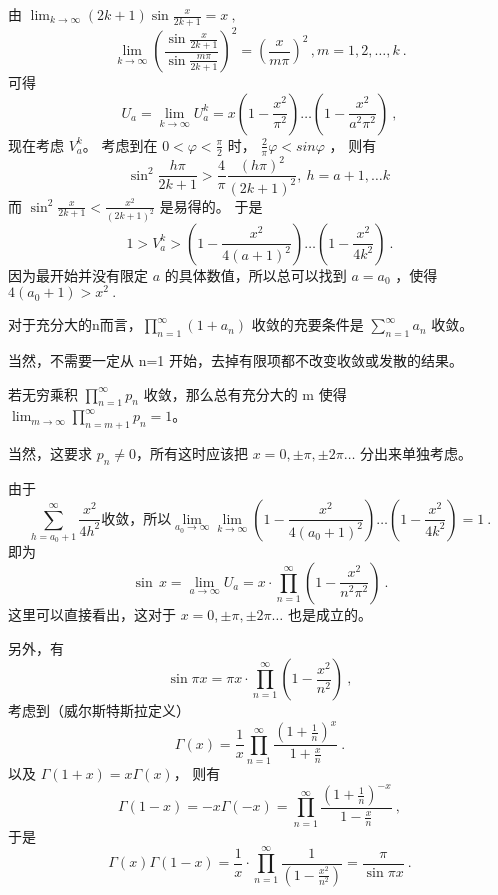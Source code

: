 由  $\lim_{k\rightarrow\infty}(2k+1)\sin\frac{x}{2k+1}=x~,$
\begin{equation}
\lim_{k\rightarrow\infty}\left( \frac{\sin\frac{x}{2k+1}}{\sin\frac{m\pi}{2k+1}} \right)^2=\left( \frac{x}{m\pi} \right)^2\,,m=1,2,\dots,k~.
\end{equation}
可得
\begin{equation}
U_a=\lim_{k\rightarrow\infty}U^k_a=x(1-\frac{x^2}{\pi^2})\dots(1-\frac{x^2}{a^2\pi^2})~,
\end{equation}
现在考虑 $V^k_a$。 考虑到在 $0<\varphi<\frac\pi2 $ 时， $\frac2\pi\varphi<sin\varphi$ ，
则有
\begin{equation}
\sin^2\frac {h\pi}{2k+1}>\frac4\pi\frac{(h\pi)^2}{(2k+1)^2},\ h=a+1,\dots k ~
\end{equation}
而 $\sin^2\frac x{2k+1}<\frac{x^2}{(2k+1)^2}$ 是易得的。 于是
\begin{equation}
1>V^k_a>(1-\frac{x^2}{4(a+1)^2})\dots(1-\frac{x^2}{4k^2})~.
\end{equation}
因为最开始并没有限定 $a$ 的具体数值，所以总可以找到 $a=a_0$ ，使得 $4(a_0+1)>x^2~.$
\begin{lemma}{}
对于充分大的n而言，$\prod_{n=1}^{\infty}(1+a_n) $ 收敛的充要条件是  $\sum_{n=1}^{\infty}{a_n}$ 收敛。
\end{lemma}
当然，不需要一定从 n=1 开始，去掉有限项都不改变收敛或发散的结果。
\begin{lemma}{}
若无穷乘积 $\prod_{n=1}^{\infty}p_n$ 收敛，那么总有充分大的 m 使得 $\lim_{m\rightarrow\infty}\prod_{n=m+1}^{\infty}p_n=1$。
\end{lemma}
当然，这要求 $ p_n\ne0 $，所有这时应该把 $ x=0,\pm\pi,\pm 2\pi\dots $ 分出来单独考虑。

由于
\begin{equation}
\sum_{h=a_0+1}^{\infty}{\frac{x^2}{4h^2}} \text{收敛，所以} \lim_{a_0\rightarrow\infty}\lim_{k\rightarrow\infty}(1-\frac{x^2}{4(a_0+1)^2})\dots(1-\frac{x^2}{4k^2})=1~.
\end{equation}
即为
\begin{equation}
\sin\,x=\lim_{a\rightarrow\infty}U_a=x\cdot \prod_{n=1}^{\infty}(1-\frac{x^2}{n^2\pi^2})~.
\end{equation}
这里可以直接看出，这对于 $x=0,\pm\pi,\pm 2\pi\dots $ 也是成立的。

另外，有
\begin{equation}
\sin\pi x=\pi x\cdot \prod_{n=1}^{\infty}(1-\frac{x^2}{n^2})~,
\end{equation}
考虑到（威尔斯特斯拉定义）
\begin{equation}
\Gamma(x)=\frac1x\prod_{n=1}^{\infty}\frac{(1+\frac1n)^{x}}{1+\frac xn}~.
\end{equation}
以及 $ \Gamma(1+x)=x\Gamma(x)$， 则有
\begin{equation}
\Gamma(1-x)=-x\Gamma(-x)=\prod_{n=1}^{\infty}\frac{(1+\frac1n)^{-x}}{1-\frac xn}~,
\end{equation}
于是
\begin{equation}
\Gamma(x)\Gamma(1-x)=\frac{1}{x}\cdot \prod_{n=1}^{\infty}\frac1{(1-\frac{x^2}{n^2})}=\frac\pi{\sin\pi x}~.
\end{equation}

